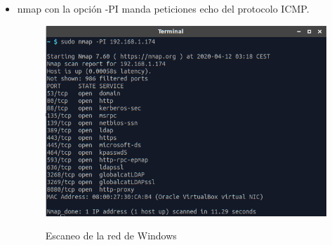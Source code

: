 \documentclass[10pt,a4paper]{article}
\begin{document}
\begin{enumerate}[label=\textbf{\alph*)}]
\begin{itemize}
\item nmap con la opción -PI manda peticiones echo del protocolo ICMP.
\begin{figure}[h!]
  \centering
  \includegraphics[scale=0.4]{k2.png}\\
  \caption{Escaneo de la red de Windows}
  \label{fig:nmap2}
\end{figure}


\end{itemize}
\end{enumerate}
\end{document}
